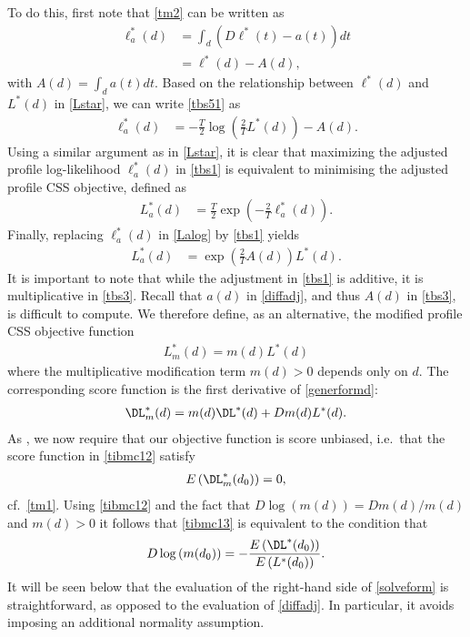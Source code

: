 {{To do this, first note that 
\eqref{tm2} can be written as
\begin{align}
      \ell^*_{a}(d) &= \int_{d} \left(D  \ell^*(t) - a(t)\right) dt \nonumber \\ 
                &=  \ell^*(d) - A(d), \label{tbs51}
\end{align}
with $A(d) = \int_{d} a(t) dt$. Based on the relationship between $ \ell^*(d)$ and $L^*(d)$ in \eqref{Lstar}, we can write \eqref{tbs51} as
\begin{align}
      \ell^*_{a}(d) &= -\frac{T}{2} \log\left( \frac{2}{T}  L^*(d)  \right) - A(d). \label{tbs1}
\end{align}
Using a similar argument as in \eqref{Lstar}, it is clear that maximizing the adjusted profile log-likelihood $ \ell^*_a (d)$ in \eqref{tbs1} is equivalent to minimising the adjusted profile CSS objective, defined as
\begin{align}
     L^*_{a}(d) &=  \frac{T}{2}  \exp \left( -\frac{2}{T}  \ell^*_{a}(d) \right). \label{Lalog}
\end{align}
Finally, replacing $ \ell^*_a (d)$ in \eqref{Lalog} by \eqref{tbs1} yields
\begin{align}
     L^*_{a}(d) &= \exp{\left(\frac{2}{T} A(d)\right)}L^*(d). \label{tbs3}
\end{align}
It is important to note that while the adjustment in \eqref{tbs1} is additive, it is multiplicative in \eqref{tbs3}. Recall that $a(d)$ in \eqref{diffadj}, and thus $A(d)$ in \eqref{tbs3}, is difficult to compute. We therefore define, as an alternative, the modified profile CSS objective function
\begin{align}
    L^* _{m}(d) = m(d) L^*(d) \label{generformd}
\end{align}
where the multiplicative modification term $m(d) > 0$ depends only on $d$. The corresponding score function is the first derivative of \eqref{generformd}:
\begin{align}
   \DL^*_{m}(d) = m(d) \DL^*(d) + Dm(d)  L^*(d). \label{tibmc12}
\end{align}
As \textcite{mccullagh1990simple}, we now require that our objective function is score unbiased, i.e.\ that the score function in \eqref{tibmc12} satisfy
\begin{align}
    E \left( \DL^*_{m}(d_0) \right) = 0, \label{tibmc13}
\end{align}
cf.\ \eqref{tm1}. Using \eqref{tibmc12} and the fact that $D \log (m(d)) = Dm(d)/m(d)$ and $m(d) > 0$ it follows that \eqref{tibmc13} is equivalent to the condition that
\begin{align}
    D \log\left( m(d_0) \right) = -\frac{E\left( \DL^*(d_0) \right)}{E\left( L^*(d_0) \right)}. \label{solveform}
\end{align}
It will be seen below that the evaluation of the right-hand side of \eqref{solveform} is straightforward, as opposed to the evaluation of \eqref{diffadj}. In particular, it avoids imposing an additional normality
assumption.


}}
